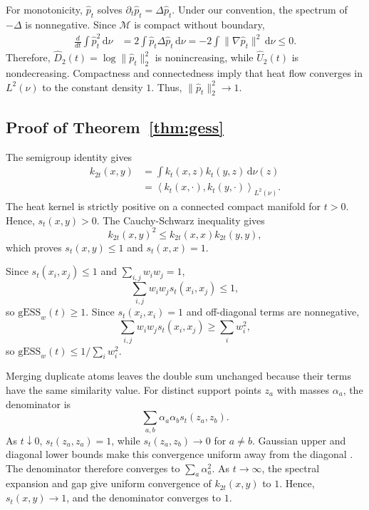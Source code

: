 \documentclass[twoside]{article}
\theoremstyle{definition}
\theoremstyle{remark}
\newcommand{\M}{\mathcal{M}}
\newcommand{\dd}{\,\mathrm{d}}
\newcommand{\gess}{\mathrm{gESS}}
\newcommand{\ip}[2]{\left\langle #1,#2\right\rangle}
\begin{document}
For monotonicity, $\widehat p_t$ solves $\partial_t\widehat p_t=\Delta\widehat p_t$. Under our convention, the spectrum of $-\Delta$ is nonnegative. Since $\M$ is compact without boundary,
\begin{align*}
  \frac{d}{dt}\int \widehat p_t^2\dd\nu
  &=2\int \widehat p_t\Delta\widehat p_t\dd\nu
   =-2\int\|\nabla\widehat p_t\|^2\dd\nu\le0.
\end{align*}
Therefore, $\widehat D_2(t)=\log\|\widehat p_t\|_2^2$ is nonincreasing, while $\widehat U_2(t)$ is nondecreasing. Compactness and connectedness imply that heat flow converges in $L^2(\nu)$ to the constant density $1$. Thus, $\|\widehat p_t\|_2^2\to1$.

\subsection{Proof of Theorem~\ref{thm:gess}}
The semigroup identity gives
\begin{align*}
  k_{2t}(x,y)&=\int k_t(x,z)k_t(y,z)\dd\nu(z)\\
  &=\ip{k_t(x,\cdot)}{k_t(y,\cdot)}_{L^2(\nu)}.
\end{align*}
The heat kernel is strictly positive on a connected compact manifold for $t>0$. Hence, $s_t(x,y)>0$. The Cauchy-Schwarz inequality gives
\begin{equation*}
  k_{2t}(x,y)^2\le k_{2t}(x,x)k_{2t}(y,y),
\end{equation*}
which proves $s_t(x,y)\le1$ and $s_t(x,x)=1$.

Since $s_t(x_i,x_j)\le1$ and $\sum_{i,j}w_iw_j=1$,
\begin{equation*}
  \sum_{i,j}w_iw_js_t(x_i,x_j)\le1,
\end{equation*}
so $\gess_w(t)\ge1$. Since $s_t(x_i,x_i)=1$ and off-diagonal terms are nonnegative,
\begin{equation*}
  \sum_{i,j}w_iw_js_t(x_i,x_j)\ge\sum_iw_i^2,
\end{equation*}
so $\gess_w(t)\le1/\sum_iw_i^2$.

Merging duplicate atoms leaves the double sum unchanged because their terms have the same similarity value. For distinct support points $z_a$ with masses $\alpha_a$, the denominator is
\begin{equation*}
  \sum_{a,b}\alpha_a\alpha_bs_t(z_a,z_b).
\end{equation*}
As $t\downarrow0$, $s_t(z_a,z_a)=1$, while $s_t(z_a,z_b)\to0$ for $a\ne b$. Gaussian upper and diagonal lower bounds make this convergence uniform away from the diagonal \citep{grigoryan_2009_HeatKernelAnalysis}. The denominator therefore converges to $\sum_a\alpha_a^2$. As $t\to\infty$, the spectral expansion and gap give uniform convergence of $k_{2t}(x,y)$ to $1$. Hence, $s_t(x,y)\to1$, and the denominator converges to $1$.
\end{document}
